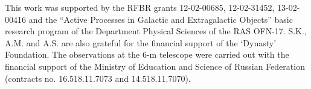 \documentclass[11pt,twoside]{article}
\begin{document}
\acknowledgements This work was supported by the RFBR grants 12-02-00685, 12-02-31452, 13-02-00416 and the ``Active Processes in Galactic and Extragalactic Objects'' basic research program of the Department Physical Sciences of the RAS OFN-17. S.K., A.M. and A.S. are also grateful for the financial support of the `Dynasty' Foundation. The observations at the 6-m telescope were carried out with the financial support of the Ministry of Education and Science of Russian Federation (contracts no. 16.518.11.7073 and 14.518.11.7070).



%

\end{document}
